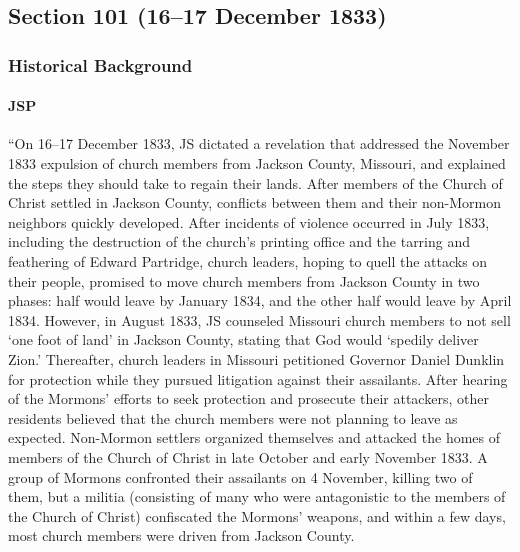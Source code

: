 \subsection{Section 101 (16--17 December 1833)}
	\label{DC101}
	
	\subsubsection{Historical Background}
		\label{DC101-HB}
		
		\paragraph{JSP}
		
			``On 16--17 December 1833, JS dictated a revelation that addressed the November 1833 expulsion of church members from Jackson County, Missouri, and explained the steps they should take to regain their lands. After members of the Church of Christ settled in Jackson County, conflicts between them and their non-Mormon neighbors quickly developed. After incidents of violence occurred in July 1833, including the destruction of the church's printing office and the tarring and feathering of Edward Partridge, church leaders, hoping to quell the attacks on their people, promised to move church members from Jackson County in two phases: half would leave by January 1834, and the other half would leave by April 1834. However, in August 1833, JS counseled Missouri church members to not sell `one foot of land' in Jackson County, stating that God would `spedily deliver Zion.' Thereafter, church leaders in Missouri petitioned Governor Daniel Dunklin for protection while they pursued litigation against their assailants. After hearing of the Mormons' efforts to seek protection and prosecute their attackers, other residents believed that the church members were not planning to leave as expected. Non-Mormon settlers organized themselves and attacked the homes of members of the Church of Christ in late October and early November 1833. A group of Mormons confronted their assailants on 4 November, killing two of them, but a militia (consisting of many who were antagonistic to the members of the Church of Christ) confiscated the Mormons' weapons, and within a few days, most church members were driven from Jackson County.
			
